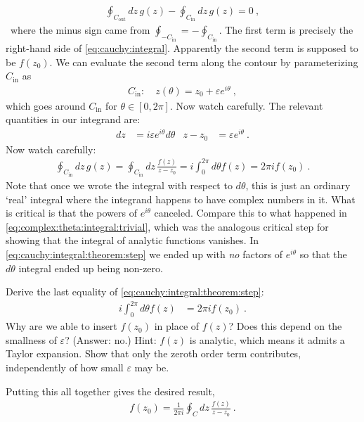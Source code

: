 \begin{align}
  \oint_{C_\text{out}} dz\, g(z)
  -
  \oint_{C_\text{in}} dz\, g(z)
  = 0 \ ,
\end{align}\
where the minus sign came from $\oint_{-C_\text{in}} = - \oint_{C_\text{in}}$. The first term is precisely the right-hand side of \eqref{eq:cauchy:integral}. Apparently the second term is supposed to be $f(z_0)$. We can evaluate the second term along the contour by parameterizing $C_\text{in}$ as
\begin{align}
  C_\text{in}: \quad z(\theta) = z_0 + \varepsilon e^{i\theta} \ ,
\end{align}
which goes around $C_\text{in}$ for $\theta \in [0,2\pi]$. Now watch carefully. The relevant quantities in our integrand are:
\begin{align}
  dz &= i\varepsilon e^{i\theta} d\theta 
  &
  z-z_0 &= \varepsilon e^{i\theta} \ .
\end{align}
Now watch carefully: 
\begin{align}
  \oint_{C_\text{in}} dz\, g(z)
  =
  \oint_{C_\text{in}} dz\, \frac{f(z)}{z-z_0}
  = 
  i\int_0^{2\pi} d\theta f(z) 
  = 2\pi i f(z_0) \ . 
  \label{eq:cauchy:integral:theorem:step}
\end{align}
Note that once we wrote the integral with respect to $d\theta$, this is just an ordinary `real' integral where the integrand happens to have complex numbers in it. What is critical is that the powers of $e^{i\theta}$ canceled. Compare this to what happened in \eqref{eq:complex:theta:integral:trivial}, which was the analogous critical step for showing that the integral of analytic functions vanishes. In \eqref{eq:cauchy:integral:theorem:step} we ended up with \emph{no} factors of $e^{i\theta}$ so that the $d\theta$ integral ended up being non-zero. 
\begin{exercise}
Derive the last equality of \eqref{eq:cauchy:integral:theorem:step}:
\begin{align}
  i\int_0^{2\pi} d\theta f(z) 
  &= 2\pi i f(z_0) \ .
\end{align}
Why are we able to insert $f(z_0)$ in place of $f(z)$? Does this depend on the smallness of $\varepsilon$? (Answer: no.) {Hint}: $f(z)$ is analytic, which means it admits a Taylor expansion. Show that only the zeroth order term contributes, independently of how small $\varepsilon$ may be.
\end{exercise}

Putting this all together gives the desired result,
\begin{align}
  f(z_0) = \frac{1}{2\pi i}\oint_C dz\, \frac{f(z)}{z-z_0} \ .
  \label{eq:cauchy:integral:theorem}
\end{align}

